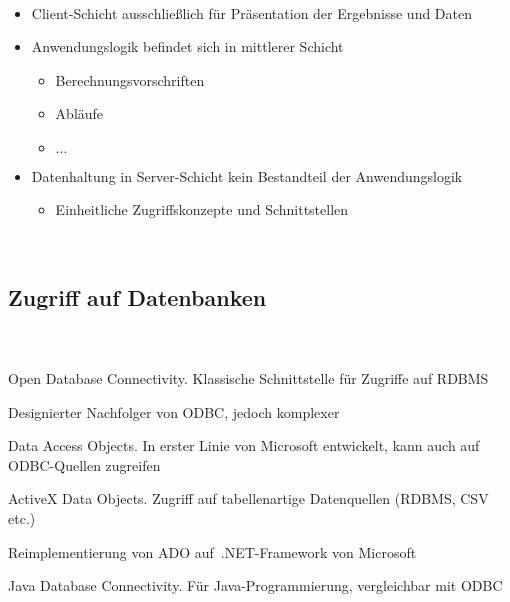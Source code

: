 \begin{frame}[t]
\frametitle{\insertsection}
\framesubtitle{\insertsubsection}
\onslide
{}\\[4pt]
\begin{itemize}
	\item Client-Schicht ausschließlich für Pr\"asentation der Ergebnisse und Daten 
	\item Anwendungslogik befindet sich in mittlerer Schicht 
	\begin{itemize}
		\item Berechnungsvorschriften
		\item Abläufe
		\item $\dots$
	\end{itemize}
	\item Datenhaltung in Server-Schicht kein Bestandteil der Anwendungslogik 
	\begin{itemize}
		\item Einheitliche Zugriffskonzepte und Schnittstellen
	\end{itemize}
\end{itemize}
\pause
\abs
{}
\\[4pt]
\pause
{}				
\end{frame}

\subsection{Zugriff auf Datenbanken}
\begin{frame}[t]
\frametitle{\insertsection}
\framesubtitle{\insertsubsection}
\onslide
{}\\[4pt]
\begin{description}[leftmargin=0cm]
	\item[ODBC] Open Database Connectivity. Klassische Schnittstelle für Zugriffe auf RDBMS
	\item[OLEDB] Designierter Nachfolger von ODBC, jedoch komplexer
	\item[DAO] Data Access Objects. In erster Linie von Microsoft entwickelt, kann auch auf ODBC-Quellen zugreifen
	\item[ADO] ActiveX Data Objects. Zugriff auf tabellenartige Datenquellen (RDBMS, CSV etc.)
	\item[ADO.NET] Reimplementierung von ADO auf~.NET-Framework von Microsoft
	\item[JDBC] Java Database Connectivity. F\"ur Java-Programmierung, vergleichbar mit ODBC 
\end{description}
\pause
\abs
{}
\end{frame}

